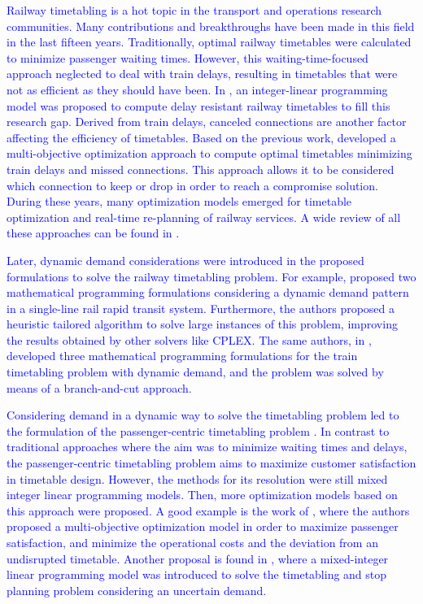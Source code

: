 \documentclass[Afour,sagev,times]{sagej}
\newcommand{\primero}[1]{\textcolor{blue}{#1}}
\begin{document}
\primero{Railway timetabling is a hot topic in the transport and operations research communities. Many contributions and breakthroughs have been made in this field in the last fifteen years. Traditionally, optimal railway timetables were calculated to minimize passenger waiting times. However, this waiting-time-focused approach neglected to deal with train delays, resulting in timetables that were not as efficient as they should have been. In \cite{Liebchen2010}, an integer-linear programming model was proposed to compute delay resistant railway timetables to fill this research gap. Derived from train delays, canceled connections are another factor affecting the efficiency of timetables. Based on the previous work, \cite{Corman2012} developed a multi-objective optimization approach to compute optimal timetables minimizing train delays and missed connections. This approach allows it to be considered which connection to keep or drop in order to reach a compromise solution. During these years, many optimization models emerged for timetable optimization and real-time re-planning of railway services. A wide review of all these approaches can be found in \cite{Cacchiani2014}.}

\primero{Later, dynamic demand considerations were introduced in the proposed formulations to solve the railway timetabling problem. For example, \cite{Barrena2014} proposed two mathematical programming formulations considering a dynamic demand pattern in a single-line rail rapid transit system. Furthermore, the authors proposed a heuristic tailored algorithm to solve large instances of this problem, improving the results obtained by other solvers like CPLEX. The same authors, in \cite{Barrena2014_2}, developed three mathematical programming formulations for the train timetabling problem with dynamic demand, and the problem was solved by means of a branch-and-cut approach.}

\primero{Considering demand in a dynamic way to solve the timetabling problem led to the formulation of the passenger-centric timetabling problem \cite{Robenek2016}. In contrast to traditional approaches where the aim was to minimize waiting times and delays, the passenger-centric timetabling problem aims to maximize customer satisfaction in timetable design. However, the methods for its resolution were still mixed integer linear programming models. Then, more optimization models based on this approach were proposed. A good example is the work of \cite{Binder2017}, where the authors proposed a multi-objective optimization model in order to maximize passenger satisfaction, and minimize the operational costs and the deviation from an undisrupted timetable. Another proposal is found in \cite{Cacchiani2020}, where a mixed-integer linear programming model was introduced to solve the timetabling and stop planning problem considering an uncertain demand. }
\end{document}
